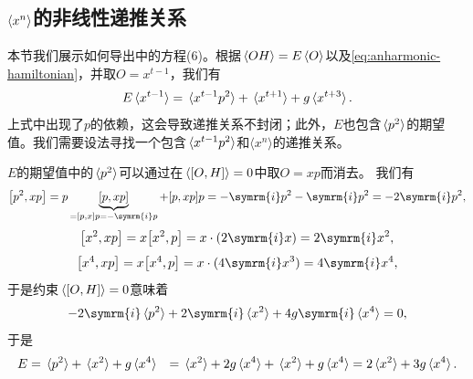 \documentclass[oneside]{fduthesis}
\newcommand{\ii}{\symrm{i}}
\def\\{}%
\begin{document}
\subsection{$\expval{x^n}$的非线性递推关系}

本节我们展示如何导出\parencite{han_matrix}中的方程(6)。根据$\expval*{OH} = E \expval*{O}$以及\eqref{eq:anharmonic-hamiltonian}，并取$O = x^{t-1}$，我们有
\begin{equation}
    E \expval*{x^{t-1}} = \expval*{x^{t-1} p^2} + \expval*{x^{t+1}} + g \expval*{x^{t+3}}.
    \label{eq:e-h-o-constraint-oscillator}
\end{equation}
上式中出现了$p$的依赖，这会导致递推关系不封闭；此外，$E$也包含$\expval*{p^2}$的期望值。我们需要设法寻找一个包含$\expval*{x^{t-1} p^2}$和$\langle x^n \rangle$的递推关系。

$E$的期望值中的$\expval*{p^2}$可以通过在$\expval*{\comm{O}{H}} = 0$中取$O = xp$而消去。
我们有
\[
    \comm{p^2}{xp} = p \underbrace{[p, xp]}_{= [p, x] p = - \ii p} + [p, xp] p = - \ii p^2 - \ii p ^2 = - 2 \ii p^2,
\]
\[
    \comm{x^2}{xp} = x\comm{x^2}{p} = x \cdot (2 \ii x) = 2 \ii x^2,
\]
\[
    \comm{x^4}{xp} = x \comm{x^4}{p} = x \cdot (4 \ii x^3) = 4 \ii x^4,
\]
于是约束$\expval*{\comm{O}{H}} = 0$意味着
\[
    - 2 \ii \expval*{p^2} + 2 \ii \expval*{x^2} + 4 g \ii \expval*{x^4} = 0,
\]
于是
\begin{equation}
    \begin{aligned}
        E &= \expval*{p^2} + \expval*{x^2} + g \expval*{x^4} \\
        &= \expval*{x^2} + 2 g \expval*{x^4} + \expval*{x^2} + g \expval*{x^4} = 2 \expval*{x^2} + 3 g \expval*{x^4}.
    \end{aligned}
    \label{eq:e-x-2-x-4}
\end{equation}
\end{document}
